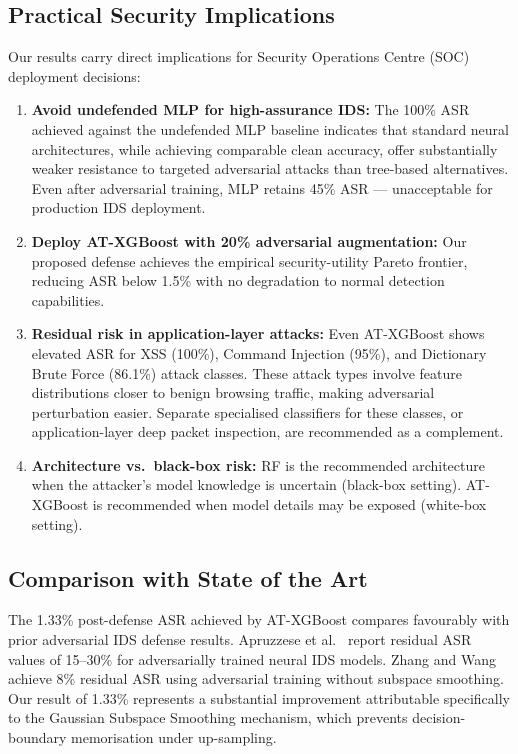 \documentclass[review,12pt]{elsarticle}
\begin{document}
\subsection{Practical Security Implications}

Our results carry direct implications for Security Operations Centre (SOC) deployment decisions:

\begin{enumerate}
    \item \textbf{Avoid undefended MLP for high-assurance IDS:} The 100\% ASR achieved against the undefended MLP baseline indicates that standard neural architectures, while achieving comparable clean accuracy, offer substantially weaker resistance to targeted adversarial attacks than tree-based alternatives. Even after adversarial training, MLP retains 45\% ASR --- unacceptable for production IDS deployment.
    \item \textbf{Deploy AT-XGBoost with 20\% adversarial augmentation:} Our proposed defense achieves the empirical security-utility Pareto frontier, reducing ASR below 1.5\% with no degradation to normal detection capabilities.
    \item \textbf{Residual risk in application-layer attacks:} Even AT-XGBoost shows elevated ASR for XSS (100\%), Command Injection (95\%), and Dictionary Brute Force (86.1\%) attack classes. These attack types involve feature distributions closer to benign browsing traffic, making adversarial perturbation easier. Separate specialised classifiers for these classes, or application-layer deep packet inspection, are recommended as a complement.
    \item \textbf{Architecture vs.\ black-box risk:} RF is the recommended architecture when the attacker's model knowledge is uncertain (black-box setting). AT-XGBoost is recommended when model details may be exposed (white-box setting).
\end{enumerate}

\subsection{Comparison with State of the Art}

The 1.33\% post-defense ASR achieved by AT-XGBoost compares favourably with prior adversarial IDS defense results. Apruzzese et al.~\cite{apruzzese2022modeling} report residual ASR values of 15--30\% for adversarially trained neural IDS models. Zhang and Wang~\cite{zhang2022adversarial} achieve 8\% residual ASR using adversarial training without subspace smoothing. Our result of 1.33\% represents a substantial improvement attributable specifically to the Gaussian Subspace Smoothing mechanism, which prevents decision-boundary memorisation under up-sampling.
\end{document}
